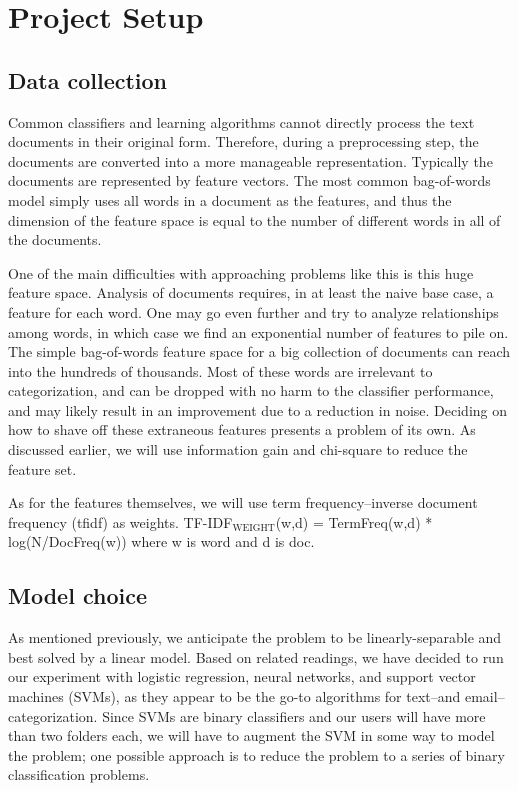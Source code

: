 \documentclass[11pt]{article}
\begin{document}
\section{Project Setup}
\label{sec-4}
\subsection{Data collection}
\label{sec-4-1}


Common classifiers and learning algorithms cannot directly process the text documents in their original form. Therefore, during a preprocessing step, the documents are converted into a more manageable representation. Typically the documents are represented by feature vectors. The most common bag-of-words model simply uses all words in a document as the features, and thus the dimension of the feature space is equal to the number of different words in all of the documents.

One of the main difficulties with approaching problems like this is this huge feature space. Analysis of documents requires, in at least the naive base case, a feature for each word. One may go even further and try to analyze relationships among words, in which case we find an exponential number of features to pile on. The simple bag-of-words feature space for a big collection of documents can reach into the hundreds of thousands. Most of these words are irrelevant to categorization, and can be dropped with no harm to the classifier performance, and may likely result in an improvement due to a reduction in noise. Deciding on how to shave off these extraneous features presents a problem of its own. As discussed earlier, we will use information gain and chi-square to reduce the feature set.

As for the features themselves, we will use term frequency–inverse document frequency (tfidf) as weights. TF-IDF$_{\mathrm{WEIGHT}}$(w,d) = TermFreq(w,d) * log(N/DocFreq(w)) where w is word and d is doc. 
\subsection{Model choice}
\label{sec-4-2}


As mentioned previously, we anticipate the problem to be linearly-separable and best solved by a linear model. Based on related readings, we have decided to run our experiment with logistic regression, neural networks, and support vector machines (SVMs), as they appear to be the go-to algorithms for text--and email--categorization. Since SVMs are binary classifiers and our users will have more than two folders each, we will have to augment the SVM in some way to model the problem; one possible approach is to reduce the problem to a series of binary classification problems.
\end{document}
